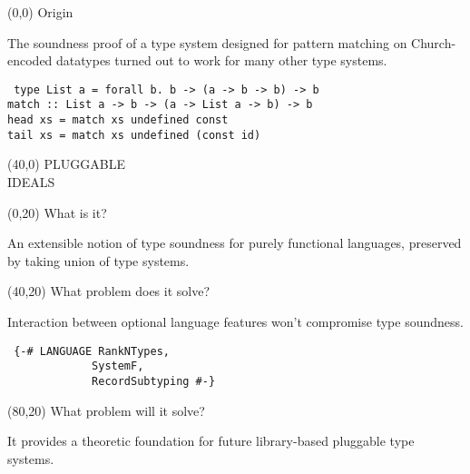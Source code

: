 \documentclass[a0]{a0poster}
\def\FONTSIZE#1{\fontsize{#1}{#1}\selectfont}
\def\HEAD#1{{\FONTSIZE{72}#1}}
\newenvironment{CODE}{\tt\FONTSIZE{36}\null}{}
\begin{document}
\raggedright
\FONTSIZE{48}

\begin{textblock}{37}(0,0)%
\HEAD{Origin}

The soundness proof of a type system designed for pattern
matching on Church-encoded datatypes turned out to work for many
other type systems.

\begin{CODE}
type List a = forall b. b -> (a -> b -> b) -> b\\
match ::~List a -> b -> (a -> List a -> b) -> b\\
head xs = match xs undefined const\\
tail xs = match xs undefined (const id)\\
\end{CODE}
\end{textblock}

\begin{textblock}{71}(40,0)
{\FONTSIZE{320}%
PLUGGABLE\\
IDEALS
}
\end{textblock}

\begin{textblock}{30}(0,20)
\HEAD{What is it?}

An extensible notion of type soundness for purely functional
languages, preserved by taking union of type systems.
\end{textblock}

\begin{textblock}{30}(40,20)
\HEAD{What problem does it solve?}

Interaction between optional language features won't compromise
type soundness.

\begin{CODE}
\def\INDENT{~~~~~~~~~~~~~}
\{-\# LANGUAGE RankNTypes,\\
\INDENT SystemF,\\
\INDENT RecordSubtyping \#-\}
\end{CODE}
\end{textblock}

\begin{textblock}{30}(80,20)
\HEAD{What problem will it solve?}

It provides a theoretic foundation for future library-based
pluggable type systems.
\end{textblock}
\end{document}
